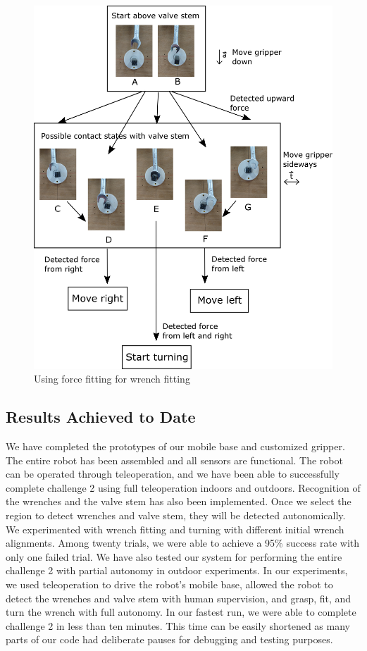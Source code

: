 \documentclass{standalone}
\begin{document}
\begin{figure}
  \includegraphics[width=\columnwidth]{sections/task2/images/figure4}
  \caption{Using force fitting for wrench fitting}
  \label{fig:figure4}
\end{figure}


\subsection{Results Achieved to Date}
We have completed the prototypes of our mobile base and customized gripper. The entire robot has been assembled and all sensors are functional. The robot can be operated through teleoperation, and we have been able to successfully complete challenge 2 using full teleoperation indoors and outdoors. 
Recognition of the wrenches and the valve stem has also been implemented. Once we select the region to detect wrenches and valve stem, they will be detected autonomically.
We experimented with wrench fitting and turning with different initial wrench alignments. Among twenty trials, we were able to achieve a 95$\%$ success rate with only one failed trial. 
We have also tested our system for performing the entire challenge 2 with partial autonomy in outdoor experiments. In our experiments, we used teleoperation to drive the robot’s mobile base, allowed the robot to detect the wrenches and valve stem with human supervision, and grasp, fit, and turn the wrench with full autonomy. In our fastest run, we were able to complete challenge 2 in less than ten minutes. This time can be easily shortened as many parts of our code had deliberate pauses for debugging and testing purposes.
\end{document}
